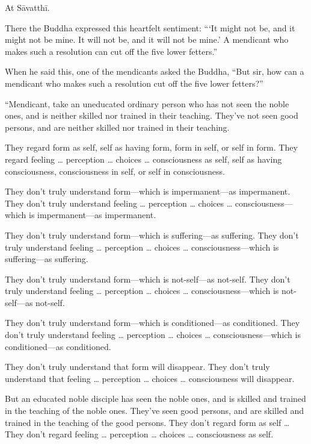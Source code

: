 \documentclass[12pt,openany]{book}%
\begin{document}
At \textsanskrit{Sāvatthī}. 

There the Buddha expressed this heartfelt sentiment: “‘It might not be, and it might not be mine. It will not be, and it will not be mine.’ A mendicant who makes such a resolution can cut off the five lower fetters.” 

When he said this, one of the mendicants asked the Buddha, “But sir, how can a mendicant who makes such a resolution cut off the five lower fetters?” 

“Mendicant, take an uneducated ordinary person who has not seen the noble ones, and is neither skilled nor trained in their teaching. They’ve not seen good persons, and are neither skilled nor trained in their teaching. 

They regard form as self, self as having form, form in self, or self in form. They regard feeling … perception … choices … consciousness as self, self as having consciousness, consciousness in self, or self in consciousness. 

They don’t truly understand form—which is impermanent—as impermanent. They don’t truly understand feeling … perception … choices … consciousness—which is impermanent—as impermanent. 

They don’t truly understand form—which is suffering—as suffering. They don’t truly understand feeling … perception … choices … consciousness—which is suffering—as suffering. 

They don’t truly understand form—which is not-self—as not-self. They don’t truly understand feeling … perception … choices … consciousness—which is not-self—as not-self. 

They don’t truly understand form—which is conditioned—as conditioned. They don’t truly understand feeling … perception … choices … consciousness—which is conditioned—as conditioned. 

They don’t truly understand that form will disappear. They don’t truly understand that feeling … perception … choices … consciousness will disappear. 

But an educated noble disciple has seen the noble ones, and is skilled and trained in the teaching of the noble ones. They’ve seen good persons, and are skilled and trained in the teaching of the good persons. They don’t regard form as self … They don’t regard feeling … perception … choices … consciousness as self. 
\end{document}
